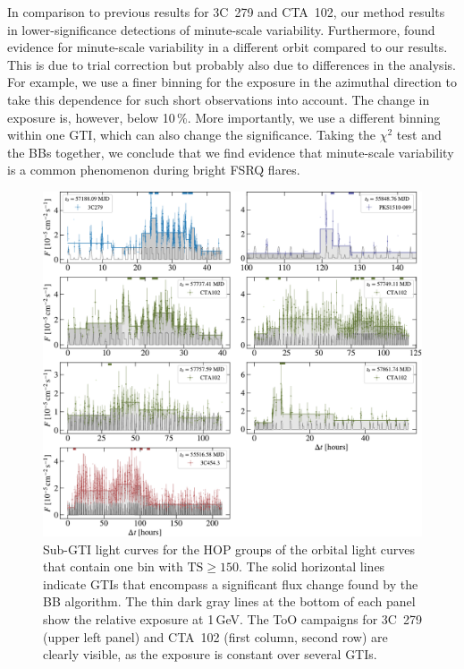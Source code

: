 \documentclass[twocolumn]{aastex62}
\begin{document}
In comparison to previous results for 3C~279 and CTA~102, our method results in lower-significance detections of minute-scale variability.
Furthermore, \citet{2018ApJ...854L..26S} found evidence for minute-scale variability in a different orbit compared to our results.
This is due to trial correction but probably also due to differences in the analysis.
For example, we use a finer binning for the exposure in the azimuthal direction to take this dependence for such short observations into account.
The change in exposure is, however, below 10\,\%.
More importantly, we use a different binning within one GTI, which can also change the significance. 
Taking the $\chi^2$ test and the BBs together, we conclude that we find evidence that minute-scale variability is a common phenomenon during bright FSRQ flares. %
\begin{figure}
    \centering
    \includegraphics[width = .9\linewidth]{lc_minute_3min.pdf}
    \caption{Sub-GTI light curves for the HOP groups of the orbital light curves that contain one bin with $\mathrm{TS} \geqslant 150$. The solid horizontal lines indicate GTIs that encompass a significant flux change found by the BB algorithm. 
    The thin dark gray lines at the bottom of each panel
    show the relative exposure at 1\,GeV. The ToO campaigns for 3C~279 (upper left panel) and CTA~102 (first column, second row) are clearly visible, as the exposure is constant over several GTIs. }
    \label{fig:lc_minutes}
\end{figure}
\end{document}
